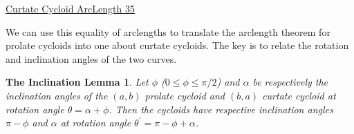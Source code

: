 \documentclass{ximera}
\newtheorem{theorem22}{The Inclination Lemma}
\begin{document}
\begin{onlineOnly}
    \begin{center}
\end{center}
\end{onlineOnly}

\href{https://www.desmos.com/calculator/s6agxwwc4s}{Curtate Cycloid ArcLength 35}




We can use this equality of arclengths to translate the arclength theorem for prolate cycloids into one about curtate cycloids. The key is to relate the rotation and inclination angles of the two curves. 

\begin{theorem22}
Let $\phi$ ($0\leq \phi \leq \pi/2$) and $\alpha$ be respectively the inclination angles of the $(a,b)$ prolate cycloid and $(b,a)$ curtate cycloid at rotation angle $\theta = \alpha + \phi$. Then the cycloids have respective inclination angles $\pi - \phi$ and $\alpha$ at rotation angle $\theta^\prime = \pi - \phi + \alpha$.


\end{theorem22} 
\end{document}

